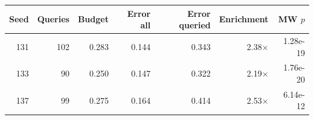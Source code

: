 \begin{tabular}{rrrrrrr}
\toprule
Seed & Queries & Budget & Error all & Error queried & Enrichment & MW $p$ \\
\midrule
131 & 102 & 0.283 & 0.144 & 0.343 & 2.38$\times$ & 1.28e-19 \\
133 & 90 & 0.250 & 0.147 & 0.322 & 2.19$\times$ & 1.76e-20 \\
137 & 99 & 0.275 & 0.164 & 0.414 & 2.53$\times$ & 6.14e-12 \\
\bottomrule
\end{tabular}
